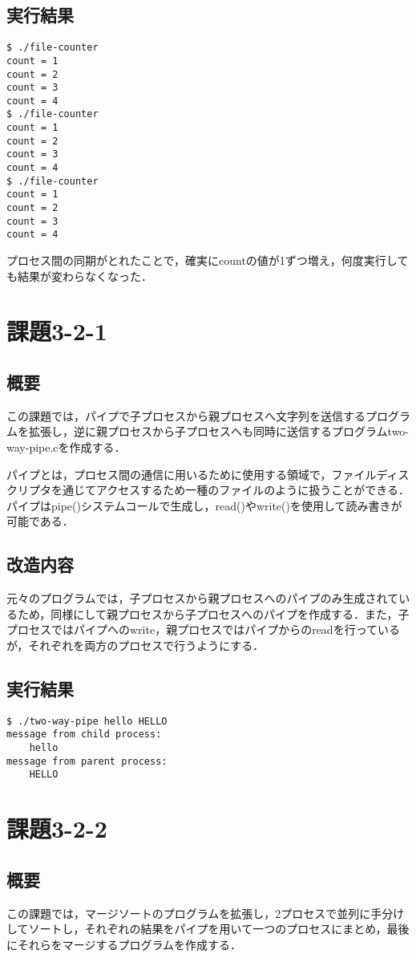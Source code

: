 \documentclass[a4j,10pt,titlepage]{jsarticle}
\begin{document}
\subsection{実行結果}
\begin{verbatim}
$ ./file-counter
count = 1
count = 2
count = 3
count = 4
$ ./file-counter
count = 1
count = 2
count = 3
count = 4
$ ./file-counter
count = 1
count = 2
count = 3
count = 4
\end{verbatim}

プロセス間の同期がとれたことで，確実にcountの値が1ずつ増え，何度実行しても結果が変わらなくなった．

\section{課題3-2-1}
\subsection{概要}
この課題では，パイプで子プロセスから親プロセスへ文字列を送信するプログラムを拡張し，逆に親プロセスから子プロセスへも同時に送信するプログラムtwo-way-pipe.cを作成する．

パイプとは，プロセス間の通信に用いるために使用する領域で，ファイルディスクリプタを通じてアクセスするため一種のファイルのように扱うことができる．パイプはpipe()システムコールで生成し，read()やwrite()を使用して読み書きが可能である．

\subsection{改造内容}
元々のプログラムでは，子プロセスから親プロセスへのパイプのみ生成されているため，同様にして親プロセスから子プロセスへのパイプを作成する．また，子プロセスではパイプへのwrite，親プロセスではパイプからのreadを行っているが，それぞれを両方のプロセスで行うようにする．

\subsection{実行結果}
\begin{verbatim}
$ ./two-way-pipe hello HELLO
message from child process: 
	hello
message from parent process: 
	HELLO
\end{verbatim}

\section{課題3-2-2}
\subsection{概要}
この課題では，マージソートのプログラムを拡張し，2プロセスで並列に手分けしてソートし，それぞれの結果をパイプを用いて一つのプロセスにまとめ，最後にそれらをマージするプログラムを作成する．
\end{document}

